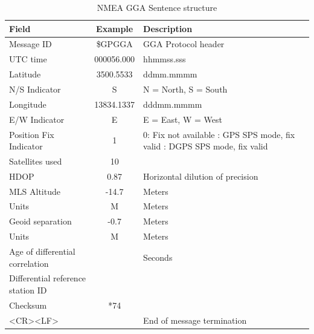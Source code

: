 \renewcommand{\arraystretch}{1.5}
\begin{table}[!h]
    \begin{center}
        \caption{NMEA GGA Sentence structure}
        \label{tab:NMEA GGA Struct}
        \begin{tabular}{ |m{4cm}|c|p{6cm}| }
            \hline
            \textbf{Field} & \textbf{Example} & \textbf{Description} \\
            \hline
            Message ID & \$GPGGA & GGA Protocol header \\
            \hline
            UTC time & 000056.000 & hhmmss.sss \\
            \hline
            Latitude & 3500.5533 & ddmm.mmmm \\
            \hline
            N/S Indicator & S & N = North, S = South\\
            \hline
            Longitude & 13834.1337 & dddmm.mmmm \\
            \hline
            E/W Indicator & E & E = East, W = West\\
            \hline
            Position Fix Indicator & 1 & 0: Fix not available \newline 1: GPS SPS mode, fix valid \newline 2: DGPS SPS mode, fix valid\\
            \hline
            Satellites used & 10 & \\
            \hline
            HDOP & 0.87 & Horizontal dilution of precision\\
            \hline
            MLS Altitude & -14.7 & Meters \\
            \hline
            Units & M & Meters \\
            \hline
            Geoid separation & -0.7 & Meters \\
            \hline
            Units & M & Meters\\
            \hline
            Age of differential correlation & & Seconds\\
            \hline
            Differential reference station ID & &  \\
            \hline
            Checksum & *74 &  \\
            \hline
            <CR><LF> & & End of message termination \\
            \hline
        \end{tabular}
    \end{center}
\end{table}
\renewcommand{\arraystretch}{1}

